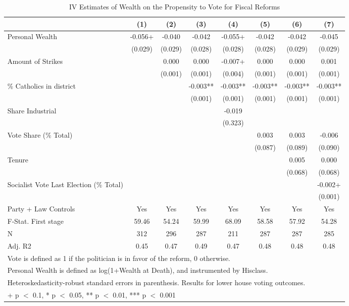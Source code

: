 \begin{table}

\caption{\label{tab:ivresults_profdummy1}IV Estimates of Wealth on the Propensity to Vote for Fiscal Reforms}
\centering
\begin{tabular}[t]{lccccccc}
\toprule
  & (1) & (2) & (3) & (4) & (5) & (6) & (7)\\
\midrule
Personal Wealth & -0.056+ & -0.040 & -0.042 & -0.055+ & -0.042 & -0.042 & -0.045\\
 & (0.029) & (0.029) & (0.028) & (0.028) & (0.028) & (0.029) & (0.029)\\
Amount of Strikes &  & 0.000 & 0.000 & -0.007+ & 0.000 & 0.000 & 0.001\\
 &  & (0.001) & (0.001) & (0.004) & (0.001) & (0.001) & (0.001)\\
\% Catholics in district &  &  & -0.003** & -0.003** & -0.003** & -0.003** & -0.003**\\
 &  &  & (0.001) & (0.001) & (0.001) & (0.001) & (0.001)\\
Share Industrial &  &  &  & -0.019 &  &  & \\
 &  &  &  & (0.323) &  &  & \\
Vote Share (\% Total) &  &  &  &  & 0.003 & 0.003 & -0.006\\
 &  &  &  &  & (0.087) & (0.089) & (0.090)\\
Tenure &  &  &  &  &  & 0.005 & 0.000\\
 &  &  &  &  &  & (0.068) & (0.068)\\
Socialist Vote Last Election (\% Total) &  &  &  &  &  &  & -0.002+\\
 &  &  &  &  &  &  & (0.001)\\
\midrule
Party + Law Controls & Yes & Yes & Yes & Yes & Yes & Yes & Yes\\
F-Stat. First stage & 59.46 & 54.24 & 59.99 & 68.09 & 58.58 & 57.92 & 54.28\\
N & 312 & 296 & 287 & 211 & 287 & 287 & 285\\
Adj. R2 & 0.45 & 0.47 & 0.49 & 0.47 & 0.48 & 0.48 & 0.48\\
\bottomrule
\multicolumn{8}{l}{\rule{0pt}{1em}Vote is defined as 1 if the politician is in favor of the reform, 0 otherwise.}\\
\multicolumn{8}{l}{\rule{0pt}{1em}Personal Wealth is defined as log(1+Wealth at Death), and instrumented by Hisclass.}\\
\multicolumn{8}{l}{\rule{0pt}{1em}Heteroskedasticity-robust standard errors in parenthesis. Results for lower house voting outcomes.}\\
\multicolumn{8}{l}{\rule{0pt}{1em}+ p $<$ 0.1, * p $<$ 0.05, ** p $<$ 0.01, *** p $<$ 0.001}\\
\end{tabular}
\end{table}
